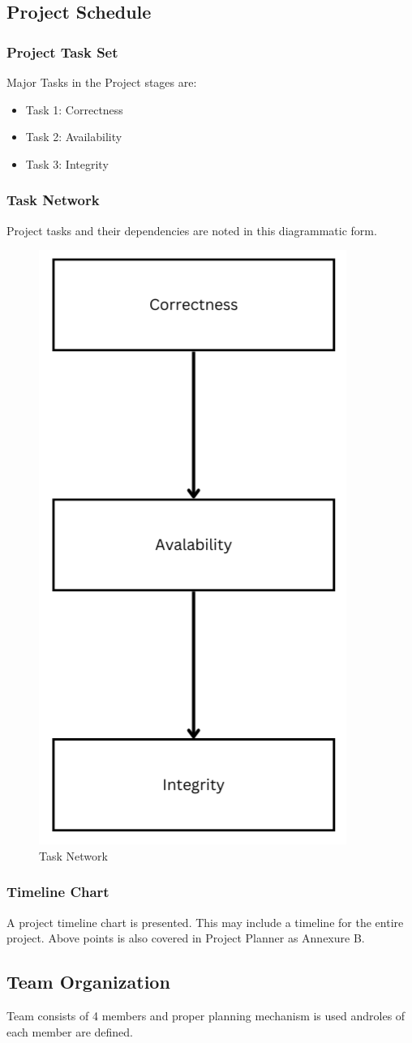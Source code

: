 \documentclass[oneside, 12pt]{book}
\begin{document}
\subsection{Project Schedule}
\subsubsection{Project Task Set}
Major Tasks in the Project stages are:
\begin{itemize}
	\item Task 1: Correctness
	\item Task 2: Availability
	\item Task 3: Integrity
\end{itemize}
\subsubsection{Task Network}
Project tasks and their dependencies are noted in this diagrammatic form.
\begin{figure}[H]
	\centering
	\includegraphics[width=0.4\linewidth]{./Resources/task-network.png}
	\caption{Task Network}
	\label{fig:task-network}
\end{figure}
\subsubsection{Timeline Chart}
A project timeline chart is presented. This may include a timeline for the entire project. Above points is also covered in Project Planner as Annexure B.
\subsection{Team Organization}
Team consists of 4 members and proper planning mechanism is used androles of each member are defined.
\end{document}
